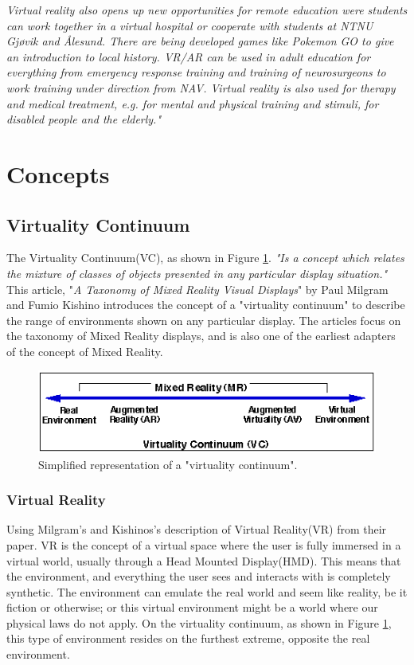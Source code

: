         \emph{Virtual reality also opens up new opportunities for remote education were students can work together in a virtual hospital or cooperate with students at NTNU Gjøvik and Ålesund. There are being developed games like Pokemon GO to give an introduction to local history. VR/AR can be used in adult education for everything from emergency response training and training of neurosurgeons to work training under direction from NAV. Virtual reality is also used for therapy and medical treatment, e.g. for mental and physical training and stimuli, for disabled people and the elderly."} \cite{EiTVRLandsby}

\section{Concepts}

    \subsection{Virtuality Continuum}
    The Virtuality Continuum(VC), as shown in Figure \ref{fig:virtualcontinuum}. \emph{"Is a concept which relates the mixture of classes of objects presented in any particular display situation."}\cite{Milgram1994} This article, "\emph{A Taxonomy of Mixed Reality Visual Displays}" by Paul Milgram and Fumio Kishino\cite{Milgram1994} introduces the concept of a "virtuality continuum" to describe the range of environments shown on any particular display. The articles focus on the taxonomy of Mixed Reality displays, and is also one of the earliest adapters of the concept of Mixed Reality.
    \begin{figure}[!ht]
        \centering
        \includegraphics[scale=1]{figures/virtualcontinuum.png}
        \caption{Simplified representation of a "virtuality continuum".\cite{Milgram1994}}
        \label{fig:virtualcontinuum}
    \end{figure}
    
    \subsubsection{Virtual Reality}
    Using Milgram's and Kishinos's description of Virtual Reality(VR) from their paper.\cite{Milgram1994} VR is the concept of a virtual space where the user is fully immersed in a virtual world, usually through a Head Mounted Display(HMD). This means that the environment, and everything the user sees and interacts with is completely synthetic. The environment can emulate the real world and seem like reality, be it fiction or otherwise; or this virtual environment might be a world where our physical laws do not apply. On the virtuality continuum, as shown in Figure \ref{fig:virtualcontinuum}, this type of environment resides on the furthest extreme, opposite the real environment.

